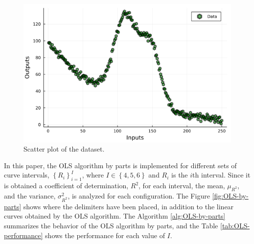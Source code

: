 \documentclass[english]{sobraep}
\begin{document}
\begin{figure}[H]
	\includegraphics[scale=.37]{../figs/scatterplot.png}
	\centering
	\caption{Scatter plot of the dataset.}
	\label{fig:scatterplot}
\end{figure}

In this paper, the OLS algorithm by parts is implemented for different sets of curve intervals, \(\left\{ R_i \right\}_{i=1}^{I}\), where \(I \in \left\{ 4,5,6 \right\}\) and \(R_i\) is the \(i\)th interval. Since it is obtained a coefficient of determination, \(R^2\), for each interval, the mean, \(\mu_{R^2}\), and the variance, \(\sigma_{R^2}^2\), is analyzed for each configuration. The Figure \ref{fig:OLS-by-parts} shows where the delimiters have been placed, in addition to the linear curves obtained by the OLS algorithm. The Algorithm \ref{alg:OLS-by-parts} summarizes the behavior of the OLS algorithm by parts, and the Table \ref{tab:OLS-performance} shows the performance for each value of \(I\).
\end{document}
